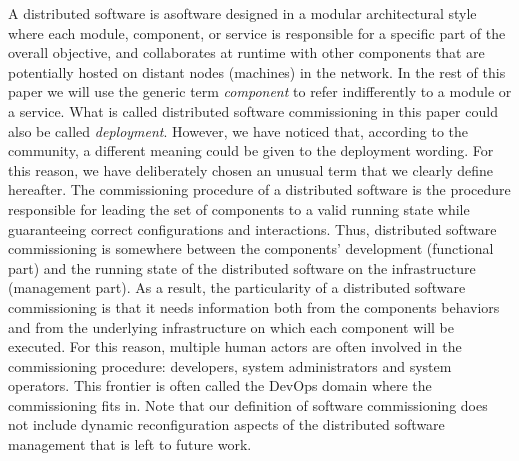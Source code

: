 A distributed software is asoftware designed in a modular architectural style
where each module, component, or service is responsible for a
specific part of the overall objective, and collaborates at runtime
with other components that are potentially hosted on distant nodes
(\ie machines) in the network. In the rest of this paper we will
use the generic term \emph{component} to refer
indifferently to a module or a service.
%
%
What is called distributed software commissioning in this paper could
also be called \emph{deployment}. However, we have noticed that,
according to the community, a different meaning could be given to the
deployment wording. For this reason, we have deliberately chosen an
unusual term that we clearly define hereafter.
%
%
The commissioning procedure of a distributed software is the procedure
responsible for leading the set of components to a valid running state
while guaranteeing correct configurations and interactions. Thus,
distributed software commissioning is somewhere between the
components' development (functional part) and the running state of the
distributed software on the infrastructure (management part). As a
result, the particularity of a distributed software commissioning is
that it needs information both from the components behaviors and from
the underlying infrastructure on which each component will be
executed. For this reason, multiple human actors are often involved in
the commissioning procedure: developers, system administrators and
system operators. This frontier is often called the DevOps domain
where the commissioning fits in. Note that our definition of software
commissioning does not include  dynamic reconfiguration aspects of the
distributed software management that is left to future work.

